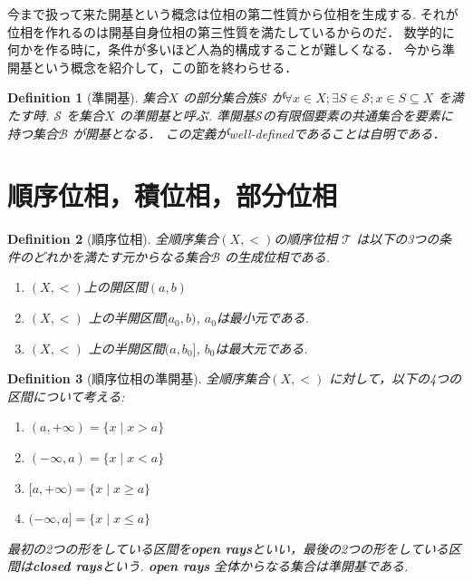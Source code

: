 \documentclass[dvipdfmx]{jbook}
\newtheorem{definition}{Definition}[section]
\theoremstyle{remark}
\theoremstyle{plain}
\begin{document}
今まで扱って来た開基という概念は位相の第二性質から位相を生成する.
それが位相を作れるのは開基自身位相の第三性質を満たしているからのだ．
数学的に何かを作る時に，条件が多いほど人為的構成することが難しくなる．
今から準開基という概念を紹介して，この節を終わらせる．\\

\begin{definition}[準開基]
	集合$X$ の部分集合族$\mathcal{S}$ が$\forall x \in X; \exists S \in \mathcal{S} ; x \in S \subseteq X$ を満たす時.
	$\mathcal{S}$ を集合$X$ の準開基と呼ぶ. 
	準開基$\mathcal{S}$の有限個要素の共通集合を要素に持つ集合$\mathcal{B}$ が開基となる．
	この定義がwell-definedであることは自明である．
\end{definition}

\section{順序位相，積位相，部分位相}

\begin{definition}[順序位相]
全順序集合$(X,<)$の順序位相 $\mathcal{T}$ は以下の3つの条件のどれかを満たす元からなる集合$\mathcal{B}$ の生成位相である.

\begin{enumerate}
	\item $\left( X, < \right) $上の開区間$\left( a,b \right) $
	\item $\left( X,< \right) $ 上の半開区間$[a_0,b)$, $a_0$は最小元である.
	\item  $\left( X, < \right) $ 上の半開区間$(a,b_0]$, $b_0$は最大元である.
\end{enumerate}

\end{definition}

\begin{definition}[順序位相の準開基]
全順序集合$\left( X,< \right) $ に対して，以下の4つの区間について考える:
	\begin{enumerate}
		\item $(a,+\infty)=\{x  \mid x>a	\}$
		\item $(-\infty , a)= \{ x  \mid  x< a \}$
		\item $[a,+\infty)= \{ x \mid x \ge a \}$
		\item  $(-\infty,a]= \{x  \mid x \le a \}$
	\end{enumerate}
	最初の2つの形をしている区間を\textbf{open rays}といい，最後の2つの形をしている区間は\textbf{closed rays}という.
	\textbf{open rays} 全体からなる集合は準開基である.
\end{definition}
\end{document}
